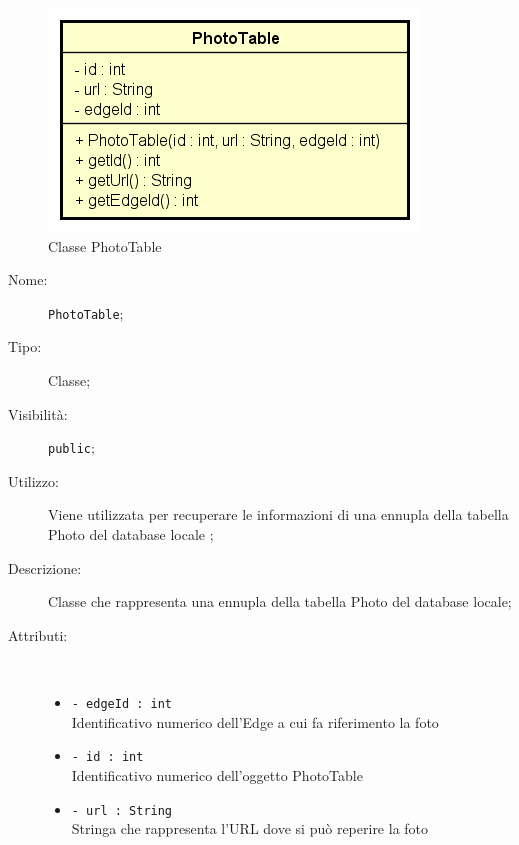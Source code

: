\documentclass[../DefinizioneDiProdotto.tex]{subfiles}
\begin{document}
    \begin{figure}[H]
        \centering
        \includegraphics{img/PhotoTable.png}
        \caption{Classe PhotoTable}\label{fig:model::dataaccess::dao::PhotoTable} 
    \end{figure}
    \begin{description}
\item[Nome:] \texttt{PhotoTable};
\item[Tipo:] Classe;
\item[Visibilità:] \texttt{public};
\item[Utilizzo:] Viene utilizzata per recuperare le informazioni di una ennupla della tabella Photo del database locale ;
\item[Descrizione:] Classe che rappresenta una ennupla della tabella Photo del database locale;
\item[Attributi:] \
\begin{itemize}
\item \texttt{- edgeId : int}\\
Identificativo numerico dell'Edge a cui fa riferimento la foto

\item \texttt{- id : int}\\
Identificativo numerico dell'oggetto PhotoTable

\item \texttt{- url : String}\\
Stringa che rappresenta l'URL dove si può reperire la foto


\end{itemize}
\end{description}
\end{document}
